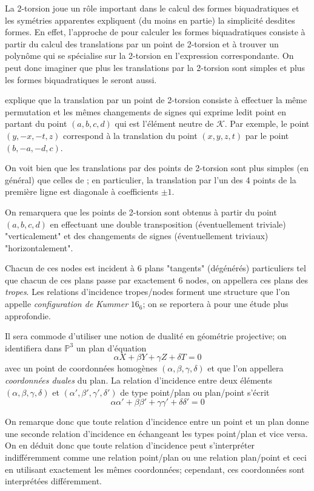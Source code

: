 \documentclass[a4paper]{article}
\theoremstyle{definition}
\theoremstyle{remark}
\numberwithin{equation}{section}
\begin{document}
La 2-torsion joue un rôle important dans le calcul des formes biquadratiques et les symétries apparentes expliquent (du moins en partie) la simplicité desdites formes. 
En effet, l'approche de \citet{cassels-Flynn} pour calculer les formes biquadratiques consiste à partir du calcul des translations par un point de 2-torsion et à trouver un polynôme qui se spécialise sur la 2-torsion en l'expression correspondante.
On peut donc imaginer que plus les translations par la 2-torsion sont simples et plus les formes biquadratiques le seront aussi.

\citet{gaudry} explique que la translation par un point de 2-torsion consiste à effectuer la même permutation et les mêmes changements de signes qui exprime ledit point en partant du point $(a,b,c,d)$ qui est l'élément neutre de $\mathcal{K}$. Par exemple, le point $(y,-x,-t,z)$ correspond à la translation du point $(x,y,z,t)$ par le point $(b,-a,-d,c)$.

On voit bien que les translations par des points de 2-torsion sont plus simples (en général) que celles de \citet{eqKum}; en particulier, la translation par l'un des 4 points de la première ligne est diagonale à coefficients $\pm 1$.

On remarquera que les points de 2-torsion sont obtenus à partir du point $(a,b,c,d)$ en effectuant une double transposition (éventuellement triviale) "verticalement" et des changements de signes (éventuellement triviaux) "horizontalement".

Chacun de ces nodes est incident à 6 plans "tangents" (dégénérés) particuliers tel que chacun de ces plans passe par exactement 6 nodes, on appellera ces plans des \emph{tropes}. Les relations d'incidence tropes/nodes forment une structure que l'on appelle \emph{configuration de Kummer} $16_6$; on se reportera à \citep{hudson} pour une étude plus approfondie.

Il sera commode d'utiliser une notion de dualité en géométrie projective; on identifiera dans $\mathbb{P}^3$ un plan d'équation $$\alpha X + \beta Y + \gamma Z + \delta T = 0$$ avec un point de coordonnées homogènes $(\alpha, \beta, \gamma, \delta)$ et que l'on appellera \emph{coordonnées duales} du plan. La relation d'incidence entre deux éléments $(\alpha, \beta, \gamma, \delta)$ et $(\alpha', \beta', \gamma', \delta')$ de type point/plan ou plan/point s'écrit
$$\alpha\alpha' + \beta\beta' + \gamma\gamma' + \delta\delta' = 0$$

On remarque donc que toute relation d'incidence entre un point et un plan donne une seconde relation d'incidence en échangeant les types point/plan et vice versa. On en déduit donc que toute relation d'incidence peut s'interpréter indifféremment comme une relation point/plan ou une relation plan/point et ceci en utilisant exactement les mêmes coordonnées; cependant, ces coordonnées sont interprétées différemment.
\end{document}
